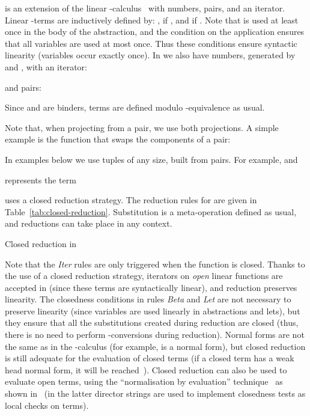 \documentclass{article}
\begin{document}
 \LLCI is an extension of the linear
-calculus~\cite{AbramskyS:comill} with numbers, pairs, and an
iterator. Linear -terms  are inductively defined
by: ,  if , and
 if .  Note that 
is used at least once in the body of the abstraction, and the
condition on the application ensures that all variables are used at
most once. Thus these conditions ensure syntactic linearity (variables
occur exactly once).  In \LLCI we also have numbers, generated by 
and , with an iterator:

and pairs:

Since  and  are binders, terms are defined modulo
-equivalence as usual. 

Note that, when projecting from a pair, we use both projections. A
simple example is the function that swaps the
components of a pair: 

In examples below we use tuples of any size, built from pairs. For example, 
 and

represents the term 



\LLCI uses a closed reduction strategy. The reduction rules for \LLCI are given in
Table~\ref{tab:closed-reduction}.  Substitution is a meta-operation
defined as usual, and reductions can take place in any context. 


\begin{table*}[ht]

\caption{Closed reduction in \LLCI}\label{tab:closed-reduction}
\end{table*}

Note that the \emph{Iter} rules are only triggered when the function
 is closed. Thanks to the use of a closed reduction strategy,
iterators on \emph{open} linear functions are accepted in \LLCI (since
these terms are syntactically linear), and reduction preserves
linearity. The  closedness conditions in rules \emph{Beta} and
\emph{Let} are not necessary to preserve linearity (since variables
are used linearly in abstractions and lets), but they ensure that all
the substitutions created during reduction are closed (thus, there is
no need to perform -conversions during reduction).  Normal
forms are not the same as in the -calculus (for example,
 is a normal form), but closed reduction is
still adequate for the evaluation of closed terms (if a closed term has a
weak head normal form, it will be reached~\cite{AlvesS:TCS}).  Closed
reduction can also be used to evaluate open terms, using the
``normalisation by evaluation'' technique~\cite{BergerU91} as shown
in~\cite{fernandezM:clores, FernandezM:aaecc05} (in the latter
director strings are used to implement closedness tests as local
checks on terms).
\end{document}
